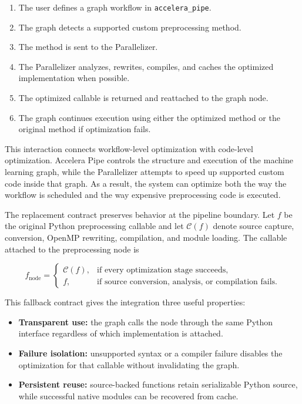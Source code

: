 \documentclass[12pt,a4paper]{report}
\begin{document}
\begin{enumerate}
  \item The user defines a graph workflow in \texttt{accelera\_pipe}.
  \item The graph detects a supported custom preprocessing method.
  \item The method is sent to the Parallelizer.
  \item The Parallelizer analyzes, rewrites, compiles, and caches the optimized
  implementation when possible.
  \item The optimized callable is returned and reattached to the graph node.
  \item The graph continues execution using either the optimized method or the
  original method if optimization fails.
\end{enumerate}

This interaction connects workflow-level optimization with code-level
optimization. Accelera Pipe controls the structure and execution of the machine
learning graph, while the Parallelizer attempts to speed up supported custom
code inside that graph. As a result, the system can optimize both the way the
workflow is scheduled and the way expensive preprocessing code is executed.

The replacement contract preserves behavior at the pipeline boundary. Let $f$
be the original Python preprocessing callable and let $\mathcal{C}(f)$ denote
source capture, conversion, OpenMP rewriting, compilation, and module loading.
The callable attached to the preprocessing node is

\begin{equation}
f_{\mathrm{node}}=
\begin{cases}
\mathcal{C}(f), & \text{if every optimization stage succeeds},\\
f, & \text{if source conversion, analysis, or compilation fails}.
\end{cases}
\label{eq:parallelizer-fallback-contract}
\end{equation}

This fallback contract gives the integration three useful properties:

\begin{itemize}
  \item \textbf{Transparent use:} the graph calls the node through the same
  Python interface regardless of which implementation is attached.
  \item \textbf{Failure isolation:} unsupported syntax or a compiler failure
  disables the optimization for that callable without invalidating the graph.
  \item \textbf{Persistent reuse:} source-backed functions retain serializable
  Python source, while successful native modules can be recovered from cache.
\end{itemize}
\end{document}
